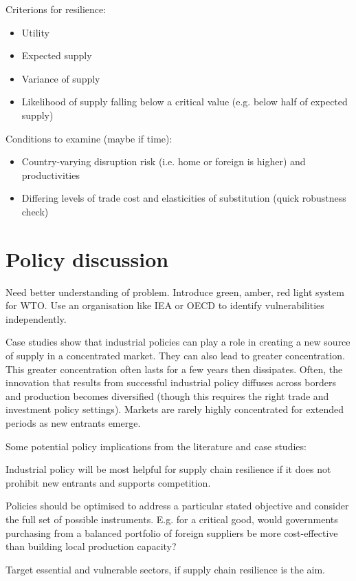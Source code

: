\documentclass{article}
\begin{document}
Criterions for resilience:
\begin{itemize}
    \item Utility
    \item Expected supply
    \item Variance of supply
    \item Likelihood of supply falling below a critical value (e.g. below half of expected supply)
\end{itemize}

Conditions to examine (maybe if time):
\begin{itemize}
    \item Country-varying disruption risk (i.e. home or foreign is higher) and productivities
    \item Differing levels of trade cost and elasticities of substitution (quick robustness check)
\end{itemize}

\section{Policy discussion}

Need better understanding of problem. Introduce green, amber, red light system for WTO. Use an organisation like IEA or OECD to identify vulnerabilities independently.

Case studies show that industrial policies can play a role in creating a new source of supply in a concentrated market. They can also lead to greater concentration. This greater concentration often lasts for a few years then dissipates. Often, the innovation that results from successful industrial policy diffuses across borders and production becomes diversified (though this requires the right trade and investment policy settings). Markets are rarely highly concentrated for extended periods as new entrants emerge. 

Some potential policy implications from the literature and case studies: 

Industrial policy will be most helpful for supply chain resilience if it does not prohibit new entrants and supports competition.  

Policies should be optimised to address a particular stated objective and consider the full set of possible instruments. E.g. for a critical good, would governments purchasing from a balanced portfolio of foreign suppliers be more cost-effective than building local production capacity? 

Target essential and vulnerable sectors, if supply chain resilience is the aim.  
\end{document}
